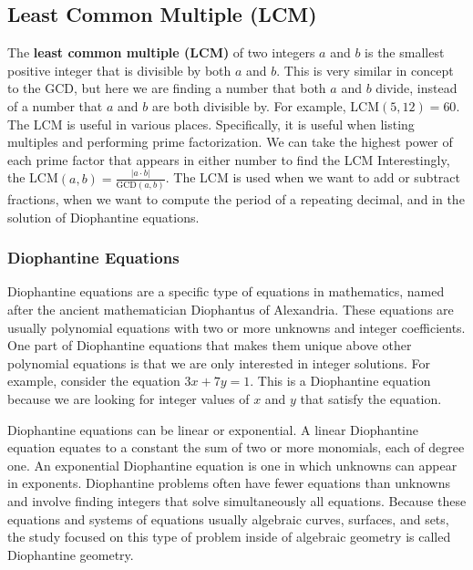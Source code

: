 \documentclass{article}
\renewcommand{\_}{\ifincsname_\else\legacyunderscore\fi}
\begin{document}
    

    \subsection{Least Common Multiple (LCM)}
    The \textbf{least common multiple (LCM)} of two integers $a$ and $b$ is the smallest positive integer that is divisible by both $a$ and $b$. This is very similar in concept to the GCD, but here we are finding a number that both $a$ and $b$ divide, instead of a number that $a$ and $b$ are both divisible by. For example, LCM$(5, 12) = 60$. The LCM is useful in various places. Specifically, it is useful when listing multiples and performing prime factorization. We can take the highest power of each prime factor that appears in either number to find the LCM Interestingly, the LCM$(a, b)=\frac{\left|a\cdot b\right|}{\text{GCD}(a, b)}$. The LCM is used when we want to add or subtract fractions, when we want to compute the period of a repeating decimal, and in the solution of Diophantine equations. 

    \subsubsection{Diophantine Equations}
    Diophantine equations are a specific type of equations in mathematics, named after the ancient mathematician Diophantus of Alexandria. These equations are usually polynomial equations with two or more unknowns and integer coefficients. One part of Diophantine equations that makes them unique above other polynomial equations is that we are only interested in integer solutions. For example, consider the equation $3x + 7y = 1$. This is a Diophantine equation because we are looking for integer values of $x$ and $y$ that satisfy the equation.

    
    Diophantine equations can be linear or exponential. A linear Diophantine equation equates to a constant the sum of two or more monomials, each of degree one. An exponential Diophantine equation is one in which unknowns can appear in exponents. Diophantine problems often have fewer equations than unknowns and involve finding integers that solve simultaneously all equations. Because these equations and systems of equations usually algebraic curves, surfaces, and sets, the study focused on this type of problem inside of algebraic geometry is called Diophantine geometry. 
\end{document}
